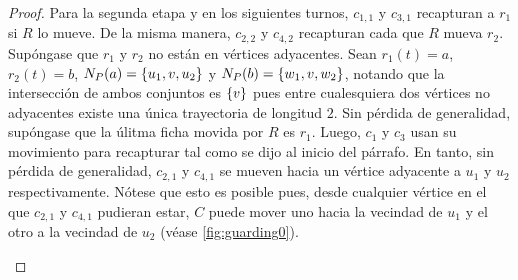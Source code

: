 \begin{proof}
    Para la segunda etapa y en los siguientes turnos, $c_{1,1}$ y $c_{3,1}$
    recapturan a $r_1$ si $R$ lo mueve. De la misma manera, $c_{2,2}$ y
    $c_{4,2}$ recapturan cada que $R$ mueva $r_2$. Sup\'ongase que $r_1$ y $r_2$
    no est\'an en v\'ertices adyacentes. Sean $r_1(t)=a$, $r_2(t)=b$,
    $N_P(a)=\left\{ u_1,v,u_2\right\}$ y $N_P(b)=\left\{ w_1,v,w_2\right\}$, notando que la
    intersecci\'on de ambos conjuntos es $\left\{ v\right\}$ pues entre cualesquiera dos
    v\'ertices no adyacentes existe una \'unica trayectoria de longitud $2$. Sin
    p\'erdida de generalidad, sup\'ongase que la \'ulitma ficha movida por $R$
    es $r_1$. Luego, $c_1$ y $c_3$ usan su movimiento para recapturar tal como
    se dijo al inicio del p\'arrafo. En tanto, sin p\'erdida de generalidad,
    $c_{2,1}$ y $c_{4,1}$ se mueven hacia un v\'ertice adyacente a $u_1$ y $u_2$
    respectivamente. N\'otese que esto es posible pues, desde cualquier
    v\'ertice en el que $c_{2,1}$ y $c_{4,1}$ pudieran estar, $C$ puede mover
    uno hacia la vecindad de $u_1$ y el otro a la vecindad de $u_2$ (v\'ease
    \cref{fig:guarding0}).

    \begin{figure}[ht!]
        \begin{tcbitemize}[raster columns=2, raster equal height, enhanced,
            colback=Black!5!white,colframe=Grey!75!black, attach title to upper,
            phantom={\setcounter{myrasternum}{\thetcbrasternum}},
            title={(\alph{myrasternum})\enspace}, halign lower=center, halign
            upper = left, lower separated=false, middle=0mm, boxsep=0mm,
            leftupper=2mm, left=2mm, right=2mm, fonttitle=\bfseries,
            coltitle=black, raster column skip=1mm,raster halign=center, raster
            row skip=1mm]

            \tcbitem
                \tcblower
            
            \tcbitem
                \tcblower
\end{tcbitemize}
\end{figure}
\end{proof}

